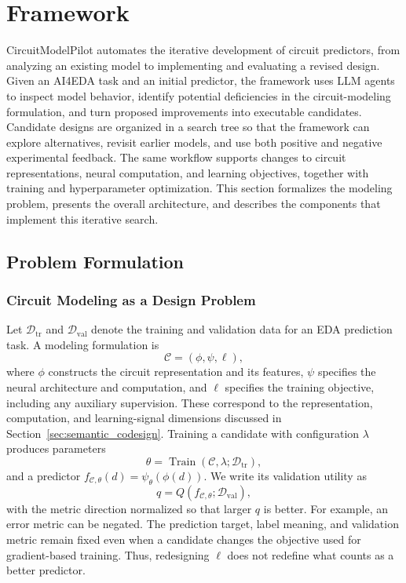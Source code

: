 \section{Framework}
\label{framework}

CircuitModelPilot automates the iterative development of circuit predictors, from analyzing an existing model to implementing and evaluating a revised design. Given an AI4EDA task and an initial predictor, the framework uses LLM agents to inspect model behavior, identify potential deficiencies in the circuit-modeling formulation, and turn proposed improvements into executable candidates. Candidate designs are organized in a search tree so that the framework can explore alternatives, revisit earlier models, and use both positive and negative experimental feedback. The same workflow supports changes to circuit representations, neural computation, and learning objectives, together with training and hyperparameter optimization. This section formalizes the modeling problem, presents the overall architecture, and describes the components that implement this iterative search.

\subsection{Problem Formulation}
\label{sec:problem_formulation}

\subsubsection{Circuit Modeling as a Design Problem}

Let $\mathcal{D}_{\mathrm{tr}}$ and $\mathcal{D}_{\mathrm{val}}$ denote the training and validation data for an EDA prediction task. A modeling formulation is
\begin{equation}
    \mathcal{C}=(\phi,\psi,\ell),
    \label{eq:codesign_tuple}
\end{equation}
where $\phi$ constructs the circuit representation and its features, $\psi$ specifies the neural architecture and computation, and $\ell$ specifies the training objective, including any auxiliary supervision. These correspond to the representation, computation, and learning-signal dimensions discussed in Section~\ref{sec:semantic_codesign}. Training a candidate with configuration $\lambda$ produces parameters
\begin{equation}
    \theta=\operatorname{Train}(\mathcal{C},\lambda;
    \mathcal{D}_{\mathrm{tr}}),
    \label{eq:candidate_training}
\end{equation}
and a predictor $f_{\mathcal{C},\theta}(d)=\psi_{\theta}(\phi(d))$. We write its validation utility as
\begin{equation}
    q=Q(f_{\mathcal{C},\theta};\mathcal{D}_{\mathrm{val}}),
    \label{eq:validation_utility}
\end{equation}
with the metric direction normalized so that larger $q$ is better. For example, an error metric can be negated. The prediction target, label meaning, and validation metric remain fixed even when a candidate changes the objective used for gradient-based training. Thus, redesigning $\ell$ does not redefine what counts as a better predictor.


